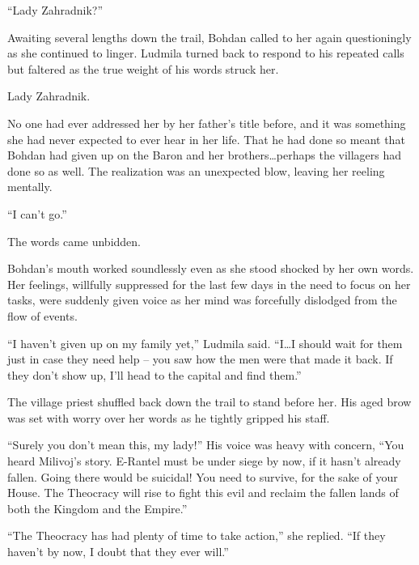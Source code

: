  

“Lady Zahradnik?”

 

Awaiting several lengths down the trail, Bohdan called to her again questioningly as she continued to linger. Ludmila turned back to respond to his repeated calls but faltered as the true weight of his words struck her.

 

Lady Zahradnik.

 

No one had ever addressed her by her father’s title before, and it was something she had never expected to ever hear in her life. That he had done so meant that Bohdan had given up on the Baron and her brothers…perhaps the villagers had done so as well. The realization was an unexpected blow, leaving her reeling mentally.

 

“I can’t go.”

 

The words came unbidden.

 

Bohdan’s mouth worked soundlessly even as she stood shocked by her own words. Her feelings, willfully suppressed for the last few days in the need to focus on her tasks, were suddenly given voice as her mind was forcefully dislodged from the flow of events.

 

“I haven’t given up on my family yet,” Ludmila said. “I…I should wait for them just in case they need help – you saw how the men were that made it back. If they don’t show up, I’ll head to the capital and find them.”

 

The village priest shuffled back down the trail to stand before her. His aged brow was set with worry over her words as he tightly gripped his staff.

 

“Surely you don’t mean this, my lady!” His voice was heavy with concern, “You heard Milivoj’s story. E-Rantel must be under siege by now, if it hasn’t already fallen. Going there would be suicidal! You need to survive, for the sake of your House. The Theocracy will rise to fight this evil and reclaim the fallen lands of both the Kingdom and the Empire.”

 

“The Theocracy has had plenty of time to take action,” she replied. “If they haven’t by now, I doubt that they ever will.”

